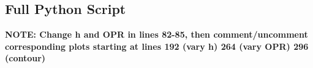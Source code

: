 \documentclass[12pt, a4paper]{article}
\begin{document}
\subsection{Full Python Script}
\textbf{NOTE: Change h and OPR in lines 82-85, then comment/uncomment corresponding plots starting at lines 192 (vary h) 264 (vary OPR) 296 (contour)}
\end{document}
